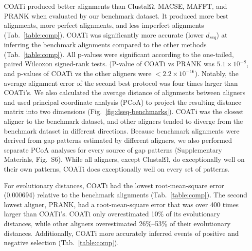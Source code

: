 \documentclass[12pt,letterpaper]{article}
\begin{document}
COATi produced better alignments than ClustalΩ, MACSE, MAFFT, and PRANK when evaluated by our benchmark dataset. It produced more best alignments, more perfect alignments, and less imperfect alignments (Tab.~\ref{table:comp}).
%
COATi was significantly more accurate (lower $d_{seq}$) at inferring the benchmark alignments compared to the other methods (Tab.~\ref{table:comp}). All p-values were significant according to the one-tailed, paired Wilcoxon signed-rank tests. (P-value of COATi vs PRANK was $5.1 \times 10^{-8}$, and p-values of COATi vs the other aligners were $< 2.2 \times 10^{-16}$). Notably, the average alignment error of the second best protocol was four times larger than COATi's. We also calculated the average distance of alignments between aligners and used principal coordinate analysis (PCoA) to project the resulting distance matrix into two dimensions (Fig.~\ref{fig:dseq-benchmarks}). COATi was the closest aligner to the benchmark dataset, and other aligners tended to diverge from the benchmark dataset in different directions. Because benchmark alignments were derived from gap patterns estimated by different aligners, we also performed separate PCoA analyses for every source of gap patterns (Supplementary Materials, Fig.~S6). While all aligners, except ClustalΩ, do exceptionally well on their own patterns, COATi does exceptionally well on every set of patterns.

For evolutionary distances, COATi had the lowest root-mean-square error (0.000694) relative to the benchmark alignments (Tab.~\ref{table:comp}). The second lowest aligner, PRANK, had a root-mean-square error that was over 400 times larger than COATi's. COATi only overestimated  10\% of its evolutionary distances, while other aligners overestimated 26\%--53\% of their evolutionary distances.
%
Additionally, COATi more accurately inferred events of positive and negative selection (Tab.~\ref{table:comp}).
\end{document}
